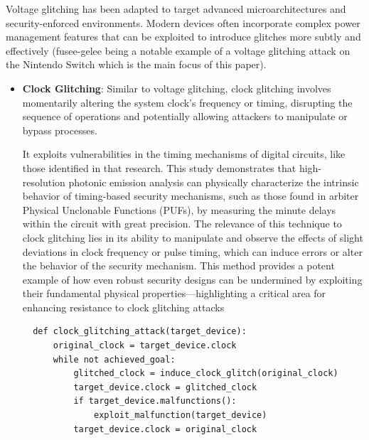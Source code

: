 \begin{itemize}
Voltage glitching has been adapted to target advanced microarchitectures and security-enforced environments. Modern devices often incorporate complex power management features that can be exploited to introduce glitches more subtly and effectively
(fusee-gelee being a notable example of a voltage glitching attack on the Nintendo Switch which is the main focus of this paper).\\
\end{itemize}

\begin{itemize}
\item
  \textbf{Clock Glitching}: Similar to voltage glitching, clock
  glitching involves momentarily altering the system clock's frequency or timing, disrupting the sequence of
operations and potentially allowing attackers to manipulate or bypass
processes.\cite{bar-elSorcererApprenticeGuide2004}

It exploits vulnerabilities in the timing mechanisms of digital circuits, like those identified in that research\cite{tajikPhysicalCharacterizationArbiter2014}. This study demonstrates that high-resolution photonic emission analysis can physically characterize the intrinsic behavior of timing-based security mechanisms, such as those found in arbiter Physical Unclonable Functions (PUFs), by measuring the minute delays within the circuit with great precision. The relevance of this technique to clock glitching lies in its ability to manipulate and observe the effects of slight deviations in clock frequency or pulse timing, which can induce errors or alter the behavior of the security mechanism. This method provides a potent example of how even robust security designs can be undermined by exploiting their fundamental physical properties—highlighting a critical area for enhancing resistance to clock glitching attacks

\begin{verbatim}
  def clock_glitching_attack(target_device):
      original_clock = target_device.clock
      while not achieved_goal:
          glitched_clock = induce_clock_glitch(original_clock)
          target_device.clock = glitched_clock
          if target_device.malfunctions():
              exploit_malfunction(target_device)
          target_device.clock = original_clock 
  \end{verbatim}

\end{itemize}

